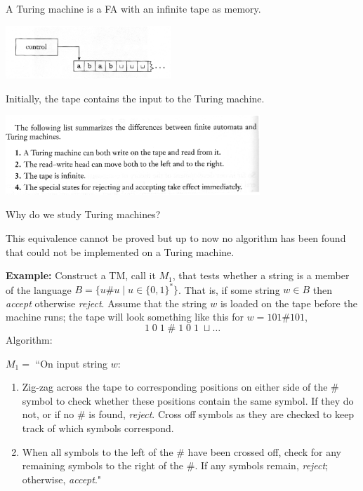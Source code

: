 \documentclass[a4paper,blends,pdf,colorBG,slideColor]{prosper}
\begin{document}
A Turing machine is a FA with an infinite tape as memory.

\begin{center}
\includegraphics[height=20mm]{images/tm_0001.eps}
\end{center}

Initially, the tape contains the input to the Turing machine.

\includegraphics[height=30mm]{images/tm_0002.eps}
\es


Why do we study Turing machines?

\begin{center}
\vspace{.5in}
\end{center}
\vspace{.5in}
This equivalence cannot be proved but up to now no algorithm has been found
that could not be implemented on a Turing machine.
\es


{\bf Example:} Construct a TM, call it $M_1$, that tests whether a string
is a member of the language $B = \{u\#u \mid u \in \{0,1\}^*\}$.  That is,
if some string $w \in B$ then {\em accept} otherwise {\em reject}.
Assume that the string $w$ is loaded on the tape before the machine runs;
the tape will look something like this for $w = 101\#101$,
\[
1\;0\;1\;\#\;1\;0\;1\;\sqcup\ldots
\]
Algorithm:

$M_1 = $ ``On input string $w$:
\begin{enumerate}
\item Zig-zag across the tape to corresponding positions on either side of the \# symbol
to check whether these positions contain the same symbol.  If they do not, or if no \#
is found, {\em reject}.  Cross off symbols as they are checked to keep track of which symbols correspond.

\item When all symbols to the left of the \# have been crossed off, check for any remaining symbols to the right of the \#. If any symbols remain, {\em reject}; otherwise, {\em accept}."
\end{enumerate}
\es
\end{document}
